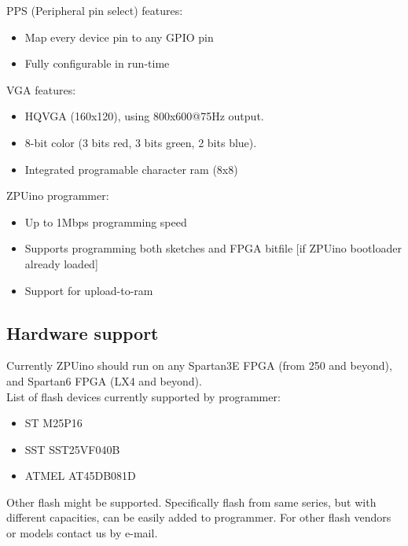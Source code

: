 PPS (Peripheral pin select) features:
\begin{itemize}
\item Map every device pin to any GPIO pin
\item Fully configurable in run-time
\end{itemize}

VGA features:
\begin{itemize}
\item HQVGA (160x120), using 800x600@75Hz output.
\item 8-bit color (3 bits red, 3 bits green, 2 bits blue).
\item Integrated programable character ram (8x8)
\end{itemize}

ZPUino programmer:
\begin{itemize}
\item Up to 1Mbps programming speed
\item Supports programming both sketches and FPGA bitfile [if ZPUino bootloader already loaded]
\item Support for upload-to-ram
\end{itemize}

\subsection{Hardware support}

Currently ZPUino should run on any Spartan3E FPGA (from 250 and beyond), and Spartan6 FPGA (LX4 and beyond). \\
List of flash devices currently supported by programmer:
\begin{itemize}
\item ST M25P16
\item SST SST25VF040B
\item ATMEL AT45DB081D
\end{itemize}
Other flash might be supported. Specifically flash from same series, but with different capacities, can be easily added to programmer.
For other flash vendors or models contact us by e-mail.

